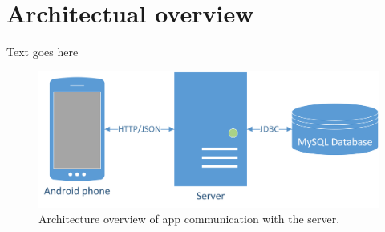 \newpage
\section{Architectual overview}
Text goes here

\begin{figure}[H]
\includegraphics[width=\textwidth]{ch/architecture/fig/arch.png}
\caption{Architecture overview of app communication with the server.}
\label{fig:architecture}
\end{figure}

